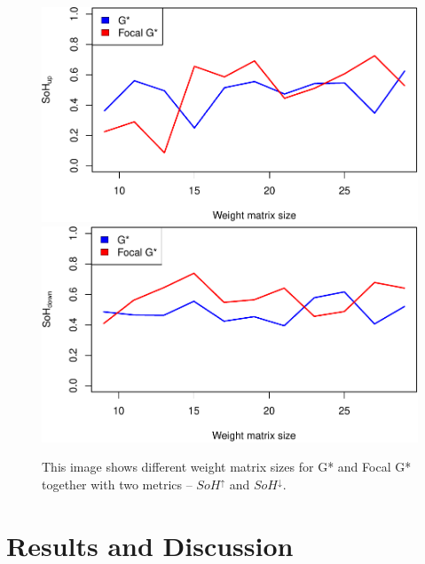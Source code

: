 \documentclass{itatnew}
\begin{document}
\begin{figure}[htp]
  \vspace{2em}
  \includegraphics[width=.45\linewidth]{images/gen-blur-sohup-1}
  \hspace{1em}
  \includegraphics[width=.45\linewidth]{images/gen-blur-sohdown-1}
  
  \caption{
    This image shows different weight matrix sizes for G* and Focal G* together 
    with two metrics -- $SoH^\uparrow$ and $SoH^\downarrow$.
  }
  \label{fig:Blur}
\end{figure}

\section{Results and Discussion}

%
\end{document}
